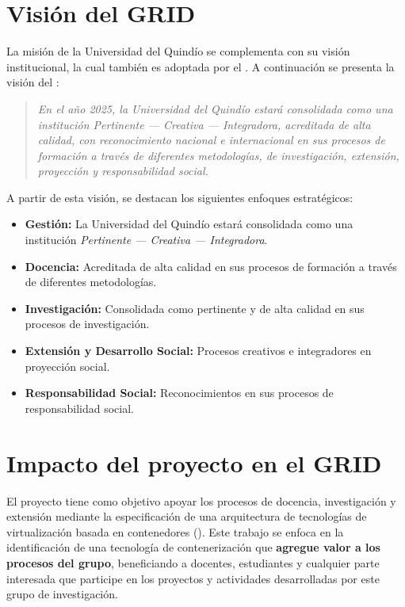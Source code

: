 \section{Visión del GRID}
La misión de la Universidad del Quindío se complementa con su visión institucional, la cual también es adoptada por el \GRID. A continuación se presenta la visión del \GRID:\@

\begin{quote}
	\textit{En el año 2025, la Universidad del Quindío estará consolidada como una institución \textit{Pertinente --- Creativa --- Integradora}, acreditada de alta calidad, con reconocimiento nacional e internacional en sus procesos de formación a través de diferentes metodologías, de investigación, extensión, proyección y responsabilidad social.}
\end{quote}

A partir de esta visión, se destacan los siguientes enfoques estratégicos:

\begin{itemize}
	\item \textbf{Gestión:} La Universidad del Quindío estará consolidada como una institución \textit{Pertinente --- Creativa --- Integradora}.

	\item \textbf{Docencia:} Acreditada de alta calidad en sus procesos de formación a través de diferentes metodologías.

	\item \textbf{Investigación:} Consolidada como pertinente y de alta calidad en sus procesos de investigación.

	\item \textbf{Extensión y Desarrollo Social:} Procesos creativos e integradores en proyección social.

	\item \textbf{Responsabilidad Social:} Reconocimientos en sus procesos de responsabilidad social.
\end{itemize}

\section{Impacto del proyecto en el GRID}

El proyecto tiene como objetivo apoyar los procesos de docencia, investigación
y extensión mediante la especificación de una arquitectura de tecnologías de
virtualización basada en contenedores (\VBC).
Este trabajo se enfoca en la identificación de una tecnología de contenerización que \textbf{agregue valor a los procesos del grupo}, beneficiando a docentes, estudiantes y cualquier parte interesada que participe en los proyectos y actividades desarrolladas por este grupo de investigación.


